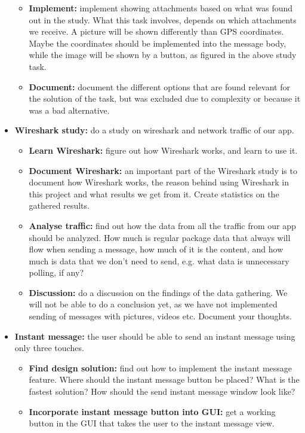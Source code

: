 \begin{itemize}
\begin{itemize}
\item{}\textbf{Implement:} implement showing attachments based on what was found out in the study. What this task involves, depends on which attachments we receive. A picture will be shown differently than GPS coordinates. Maybe the coordinates should be implemented into the message body, while the image will be shown by a button, as figured in the above study task.
\item{}\textbf{Document:} document the different options that are found relevant for the solution of the task, but was excluded due to complexity or because it was a bad alternative.
\end{itemize}
\item{}\textbf{Wireshark study:} do a study on wireshark and network traffic of our app.
\begin{itemize}
\item{}\textbf{Learn Wireshark:} figure out how Wireshark works, and learn to use it.
\item{}\textbf{Document Wireshark:} an important part of the Wireshark study is to document how Wireshark works, the reason behind using Wireshark in this project and what results we get from it. Create statistics on the gathered results.
\item{}\textbf{Analyse traffic:} find out how the data from all the traffic from our app should be analyzed. How much is regular package data that always will flow when sending a message, how much of it is the content, and how much is data that we don’t need to send, e.g. what data is unnecessary polling, if any?
\item{}\textbf{Discussion:} do a discussion on the findings of the data gathering. We will not be able to do a conclusion yet, as we have not implemented sending of messages with pictures, videos etc. Document your thoughts.
\end{itemize}
\item{}\textbf{Instant message:} the user should be able to send an instant message using only three touches.
\begin{itemize}
\item{}\textbf{Find design solution:} find out how to implement the instant message feature. Where should the instant message button be placed? What is the fastest solution? How should the send instant message window look like?
\item{}\textbf{Incorporate instant message button into GUI:} get a working button in the GUI that takes the user to the instant message view.

\end{itemize}
\end{itemize}
